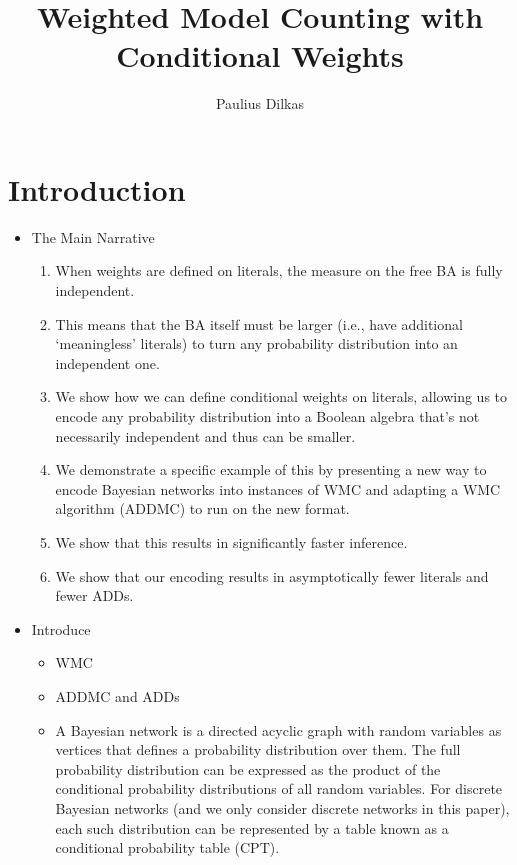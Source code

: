 \documentclass{article}
\title{Weighted Model Counting with Conditional Weights}
\author{Paulius Dilkas}
\theoremstyle{definition}
\theoremstyle{remark}
\begin{document}
\maketitle

\section{Introduction}

\begin{itemize}
\item The Main Narrative
  \begin{enumerate}
  \item When weights are defined on literals, the measure on the free BA is
    fully independent.
  \item This means that the BA itself must be larger (i.e., have additional
    `meaningless' literals) to turn any probability distribution into an
    independent one.
  \item We show how we can define conditional weights on literals, allowing us
    to encode any probability distribution into a Boolean algebra that's not
    necessarily independent and thus can be smaller.
  \item We demonstrate a specific example of this by presenting a new way to
    encode Bayesian networks into instances of WMC and adapting a WMC algorithm
    (ADDMC) to run on the new format.
  \item We show that this results in significantly faster inference.
  \item We show that our encoding results in asymptotically fewer literals and
    fewer ADDs.
  \end{enumerate}
\item Introduce
  \begin{itemize}
  \item WMC \cite{DBLP:conf/aaai/SangBK05}
  \item ADDMC \cite{DBLP:conf/aaai/DudekPV20} and ADDs
    \cite{DBLP:journals/fmsd/BaharFGHMPS97}
  \item A Bayesian network is a directed acyclic graph with random variables as
    vertices that defines a probability distribution over them. The full
    probability distribution can be expressed as the product of the conditional
    probability distributions of all random variables. For discrete Bayesian
    networks (and we only consider discrete networks in this paper), each such
    distribution can be represented by a table known as a conditional
    probability table (CPT).

\end{itemize}
\end{itemize}
\end{document}
